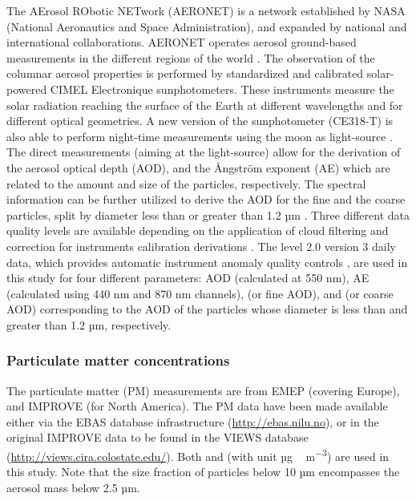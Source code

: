 \documentclass[acp, manuscript]{copernicus}
\begin{document}
The AErosol RObotic NETwork (AERONET) is a network established by NASA (National Aeronautics and Space Administration), and expanded by national and international collaborations. AERONET operates aerosol ground-based measurements in the different regions of the world \citep{holben2001emerging}. The observation of the columnar aerosol properties is performed by standardized and calibrated solar-powered CIMEL Electronique sunphotometers. These instruments measure the solar radiation reaching the surface of the Earth at different wavelengths and for different optical geometries. A new version of the sunphotometer (CE318-T) is also able to perform night-time measurements using the moon as light-source \citep{barreto2016new}. The direct measurements (aiming at the light-source) allow for the derivation of the aerosol optical depth (AOD), and the Ångström exponent (AE) which are related to the amount and size of the particles, respectively. The spectral information can be further utilized to derive the AOD for the fine and the coarse particles, split by diameter less than or greater than 1.2 \unit{µm} \citep{o2003spectral}. Three different data quality levels are available depending on the application of cloud filtering and correction for instruments calibration derivations \citep{smirnov2000cloud,smirnov2004aeronet}. The level 2.0 version 3 daily data, which provides automatic instrument anomaly quality controls \citep{giles2019advancements}, are used in this study for four different parameters:
AOD (calculated at 550 nm), AE (calculated using 440 nm and 870 nm channels),  (or fine AOD), and  (or coarse AOD) corresponding to the AOD of the particles whose diameter is less than and greater than 1.2 \unit{µm}, respectively.

\subsubsection{Particulate matter concentrations}
The particulate matter (PM) measurements are from EMEP (covering Europe), and IMPROVE (for North America). The PM data have been made available either via the EBAS database infrastructure  (\url{http://ebas.nilu.no}), or in the original IMPROVE data to be found in the VIEWS database (\url{http://views.cira.colostate.edu/}). Both  and  (with unit \unit{µg\,m^{-3}}) are used in this study. Note that the  size fraction of particles below 10 \unit{µm} encompasses the  aerosol mass below 2.5 \unit{µm}.
\end{document}
